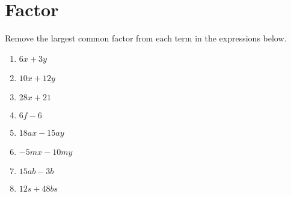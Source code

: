 \documentclass[12pt,letterpaper]{article}
\begin{document}
\section*{Factor}
{Remove the largest common factor from each term in the expressions below.}

\begin{large}
\begin{enumerate}
\item \quad $6x + 3y$

\addvspace{0.5in}

\item \quad $10x + 12y$

\addvspace{0.5in}

\item \quad $28x + 21$

\addvspace{0.5in}

\item \quad $6f - 6$

\addvspace{0.5in}

\item \quad $18ax - 15ay$

\addvspace{0.5in}

\item \quad $-5mx - 10my$

\addvspace{0.5in}

\item \quad $15ab - 3b$

\addvspace{0.5in}

\item \quad $12s + 48bs$

\addvspace{0.5in}

\end{enumerate}
\end{large}

\pagebreak
\end{document}
